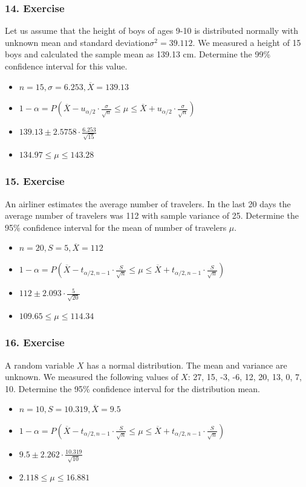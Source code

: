 \documentclass{beamer}
\begin{document}
\begin{frame}
\frametitle{14. Exercise}

Let us assume that the height of boys of ages 9-10 is distributed normally with unknown mean and standard deviation$\sigma^2=39.112$. We measured a height of 15 boys and calculated the sample mean as 139.13 cm. Determine the 99\% confidence interval for this value.

\begin{itemize}
\item<2-> $n = 15, \sigma  = 6.253, \overline{X} = 139.13$
\item<3-> $1 - \alpha = P(\overline{X} - u_{\alpha/2} \cdot \frac{\sigma}{\sqrt{n}} \leq \mu \leq \overline{X} + u_{\alpha/2} \cdot \frac{\sigma}{\sqrt{n}})$
\item<4-> $139.13 \pm 2.5758 \cdot \frac{6.253}{\sqrt{15}}$
\item<5-> $134.97 \leq \mu \leq 143.28$
\end{itemize}
\end{frame}


\begin{frame}
\frametitle{15. Exercise}
An airliner estimates the average number of travelers. In the last 20 days the average number of travelers was 112 with sample variance of 25. Determine the 95\% confidence interval for the mean of number of travelers $\mu$.

\begin{itemize}
\item<2-> $n = 20, S  = 5, \overline{X} = 112$
\item<3-> $1 - \alpha = P(\overline{X} - t_{\alpha/2, n-1} \cdot \frac{S}{\sqrt{n}} \leq \mu \leq \overline{X} + t_{\alpha/2, n-1} \cdot \frac{S}{\sqrt{n}})$
\item<4-> $112 \pm 2.093 \cdot \frac{5}{\sqrt{20}}$
\item<5-> $109.65 \leq \mu \leq 114.34$
\end{itemize}
\end{frame}


\begin{frame}
\frametitle{16. Exercise}
A random variable $X$ has a normal distribution. The mean and variance are unknown. We measured the following values of $X$: 27, 15, -3, -6, 12, 20, 13, 0, 7, 10. Determine the 95\% confidence interval for the distribution mean.

\begin{itemize}
\item<2-> $n = 10, S  = 10.319, \overline{X} = 9.5$
\item<3-> $1 - \alpha = P(\overline{X} - t_{\alpha/2, n-1} \cdot \frac{S}{\sqrt{n}} \leq \mu \leq \overline{X} + t_{\alpha/2, n-1} \cdot \frac{S}{\sqrt{n}})$
\item<4-> $9.5 \pm 2.262 \cdot \frac{10.319}{\sqrt{10}}$
\item<5-> $2.118 \leq \mu \leq 16.881$
\end{itemize}
\end{frame}
\end{document}
